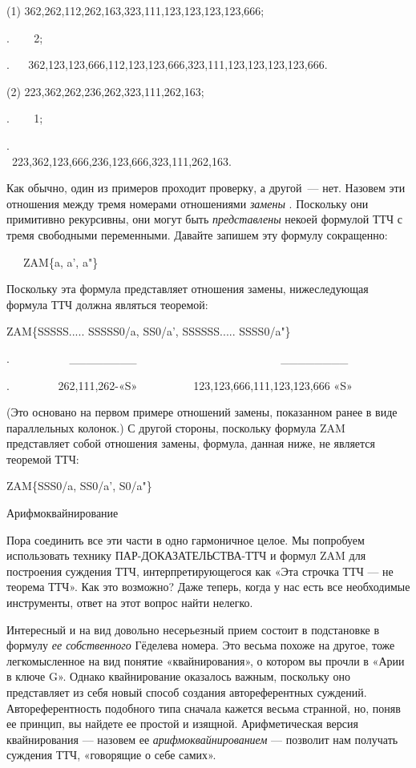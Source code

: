 \documentclass[../main.tex]{subfiles}
\begin{document}
(1) 362,262,112,262,163,323,111,123,123,123,123,666;

.~ ~ ~2;

. ~ ~362,123,123,666,112,123,123,666,323,111,123,123,123,123,666.

(2) 223,362,262,236,262,323,111,262,163;

.~ ~ ~1;

.~ ~ ~223,362,123,666,236,123,666,323,111,262,163.~~~~~~~~~~~~~~~~~~~~~~~~~~~~

Как обычно, один из примеров проходит проверку, а другой~--- нет. Назовем эти отношения между тремя номерами отношениями \emph{замены} . Поскольку они примитивно рекурсивны, они могут быть \emph{представлены} некоей формулой ТТЧ с тремя свободными переменными. Давайте запишем эту формулу сокращенно:

~~~ZAM\{a, a', a"\}

Поскольку эта формула представляет отношения замены, нижеследующая формула ТТЧ должна являться теоремой:

ZAM\{SSSSS..... SSSSS0/a, SS0/a', SSSSSS..... SSSS0/a"\}

.~~~~~~~~~ ~\textbar\_\_\_\_\_\_\_\_\textbar~~~~~~~~~~~~~~~~~~~~~~~~ ~\textbar\_\_\_\_\_\_\_\_\textbar{}

.~~~~~~~ ~262,111,262-«S»~~~~~~~~~~123,123,666,111,123,123,666 «S»

(Это основано на первом примере отношений замены, показанном ранее в виде параллельных колонок.) С другой стороны, поскольку формула ZAM представляет собой отношения замены, формула, данная ниже, не является теоремой ТТЧ:

ZAM\{SSS0/a, SS0/a', S0/a"\}

Арифмоквайнирование

Пора соединить все эти части в одно гармоничное целое. Мы попробуем использовать технику ПАР-ДОКАЗАТЕЛЬСТВА-ТТЧ и формул ZAM для построения суждения ТТЧ, интерпретирующегося как «Эта строчка ТТЧ --- не теорема ТТЧ». Как это возможно? Даже теперь, когда у нас есть все необходимые инструменты, ответ на этот вопрос найти нелегко.

Интересный и на вид довольно несерьезный прием состоит в подстановке в формулу \emph{ее собственного} Гёделева номера. Это весьма похоже на другое, тоже легкомысленное на вид понятие «квайнирования», о котором вы прочли в «Арии в ключе G». Однако квайнирование оказалось важным, поскольку оно представляет из себя новый способ создания автореферентных суждений. Автореферентность подобного типа сначала кажется весьма странной, но, поняв ее принцип, вы найдете ее простой и изящной. Арифметическая версия квайнирования --- назовем ее \emph{арифмоквайнированием} --- позволит нам получать суждения ТТЧ, «говорящие о себе самих».
\end{document}
